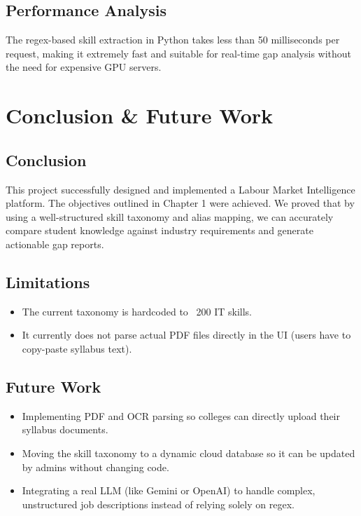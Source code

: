 \documentclass[12pt,a4paper]{report}
\begin{document}
\section{Performance Analysis}
The regex-based skill extraction in Python takes less than 50 milliseconds per request, making it extremely fast and suitable for real-time gap analysis without the need for expensive GPU servers.

\chapter{Conclusion \& Future Work}

\section{Conclusion}
This project successfully designed and implemented a Labour Market Intelligence platform. The objectives outlined in Chapter 1 were achieved. We proved that by using a well-structured skill taxonomy and alias mapping, we can accurately compare student knowledge against industry requirements and generate actionable gap reports.

\section{Limitations}
\begin{itemize}
    \item The current taxonomy is hardcoded to ~200 IT skills.
    \item It currently does not parse actual PDF files directly in the UI (users have to copy-paste syllabus text).
\end{itemize}

\section{Future Work}
\begin{itemize}
    \item Implementing PDF and OCR parsing so colleges can directly upload their syllabus documents.
    \item Moving the skill taxonomy to a dynamic cloud database so it can be updated by admins without changing code.
    \item Integrating a real LLM (like Gemini or OpenAI) to handle complex, unstructured job descriptions instead of relying solely on regex.
\end{itemize}
\end{document}
